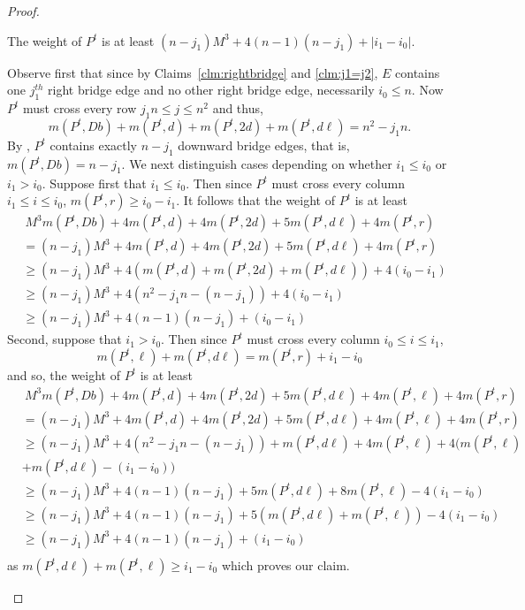 \begin{proof}
\begin{claim}
\label{clm:weightPt}
The weight of $P^t$ is at least $(n-j_1)M^3 + 4(n-1)(n-j_1) + |i_1 - i_0|$.
\end{claim}

\begin{claimproof}
Observe first that since by Claims~\ref{clm:rightbridge} and \ref{clm:j1=j2}, $E$ contains one $j_1^{th}$ right bridge edge and no other right bridge edge, necessarily $i_0 \leq n$. Now $P^t$ must cross every row $j_1n \leq j \leq n^2$ and thus, 
\[
m(P^t,Db) + m(P^t,d) + m(P^t,2d) + m(P^t,d\ell) = n^2 - j_1n.
\]
By , $P^t$ contains exactly $n-j_1$ downward bridge edges, that is, $m(P^t,Db) = n - j_1$. We next distinguish cases depending on whether $i_1 \leq i_0$ or $i_1 > i_0$. Suppose first that $i_1 \leq i_0$. Then since $P^t$ must cross every column $i_1 \leq i \leq i_0$, $m(P^t,r) \geq i_0 - i_1$. It follows that the weight of $P^t$ is at least 
\begin{equation*}
\begin{split}
&~M^3m(P^t,Db) + 4m(P^t,d) + 4m(P^t,2d) + 5m(P^t,d\ell) + 4m(P^t,r) \\
& = (n-j_1)M^3 + 4m(P^t,d) + 4m(P^t,2d) + 5m(P^t,d\ell) + 4m(P^t,r) \\
& \geq (n-j_1)M^3 + 4(m(P^t,d) + m(P^t,2d) + m(P^t,d\ell)) + 4(i_0 - i_1) \\
& \geq (n-j_1)M^3 + 4(n^2 - j_1n - (n-j_1)) + 4(i_0 - i_1)\\
& \geq (n-j_1)M^3 + 4(n-1)(n-j_1) + (i_0 - i_1)
\end{split}
\end{equation*}
Second, suppose that $i_1 > i_0$. Then since $P^t$ must cross every column $i_0 \leq i \leq i_1$,
\[
m(P^t,\ell) + m(P^t,d\ell) = m(P^t,r) + i_1 - i_0
\]
and so, the weight of $P^t$ is at least
\begin{equation*}
\begin{split}
&~M^3m(P^t,Db) + 4m(P^t,d) + 4m(P^t,2d) + 5m(P^t,d\ell) + 4m(P^t,\ell) + 4m(P^t,r) \\
& = (n-j_1)M^3 + 4m(P^t,d) + 4m(P^t,2d) + 5m(P^t,d\ell) + 4m(P^t,\ell) + 4m(P^t,r) \\
& \geq (n-j_1)M^3 + 4(n^2 - j_1n - (n-j_1)) + m(P^t,d\ell) + 4m(P^t,\ell) + 4(m(P^t,\ell)\\
&+m(P^t,d\ell) - (i_1 - i_0))\\
& \geq (n-j_1)M^3 + 4(n-1)(n-j_1) + 5m(P^t,d\ell) + 8m(P^t,\ell) - 4(i_1 - i_0)\\
& \geq (n-j_1)M^3 + 4(n-1)(n-j_1) + 5(m(P^t,d\ell) + m(P^t,\ell)) - 4(i_1 - i_0)\\
& \geq (n-j_1)M^3 + 4(n-1)(n-j_1) + (i_1 - i_0)\\
\end{split}
\end{equation*}
as $m(P^t,d\ell) + m(P^t,\ell) \geq i_1 - i_0$ which proves our claim.
\end{claimproof}


\end{proof}
